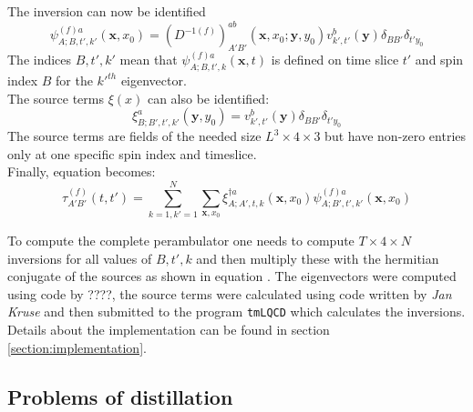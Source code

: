     The inversion  can now be identified
    \begin{equation}
        \psi^{(f)a}_{A;B,t',k'}(\textbf{x},x_0) = (D^{-1(f)})^{ab}_{A'B'}(\textbf{x},x_0;\textbf{y},y_0)
            v_{k',t'}^{b}(\textbf{y})\delta_{BB'}\delta_{t'y_0}
    \end{equation}
    The indices $B,t',k'$ mean that $\psi^{(f)a}_{A;B,t',k}(\textbf{x},t)$ is defined on time slice $t'$ and spin index $B$ for the $k'^{th}$ eigenvector.\\
    
    The source terms $\xi(x)$ can also be identified:
    \begin{equation}
        \xi^a_{B;B',t',k'}(\textbf{y},y_0) =  v_{k',t'}^{b}(\textbf{y})\delta_{BB'}\delta_{t'y_0}
    \end{equation}
    The source terms are fields of the needed size $L^3 \times 4 \times 3$ but have non-zero entries only at one specific spin index and timeslice.\\
    
    Finally, equation  becomes:
    \begin{equation}\label{perambulator_with_inversion}
        \tau^{(f)}_{A'B'}(t,t') = \sum_{k=1,k'=1}^N \sum_{\textbf{x},x_0} \xi^{\dagger a}_{A;A',t,k}(\textbf{x},x_0) \psi^{(f)a}_{A;B',t',k'}(\textbf{x},x_0) 
    \end{equation}
    
    To compute the complete perambulator one needs to compute $T \times 4 \times N$ inversions for all values of $B,t',k$ and then multiply these with the hermitian conjugate of the sources as shown in equation . The eigenvectors were computed using code by ????, the source terms were calculated using code written by \textit{Jan Kruse} \cite{bachelor_thesis_jan} and then submitted to the program \verb+tmLQCD+ \cite{jansen_urbach_2009} which calculates the inversions. Details about the implementation can be found in section \ref{section:implementation}.
    
\subsection{Problems of distillation}
    